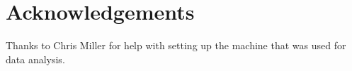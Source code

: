 
\section*{Acknowledgements}
Thanks to Chris Miller for help with setting up the machine that was used for data analysis.